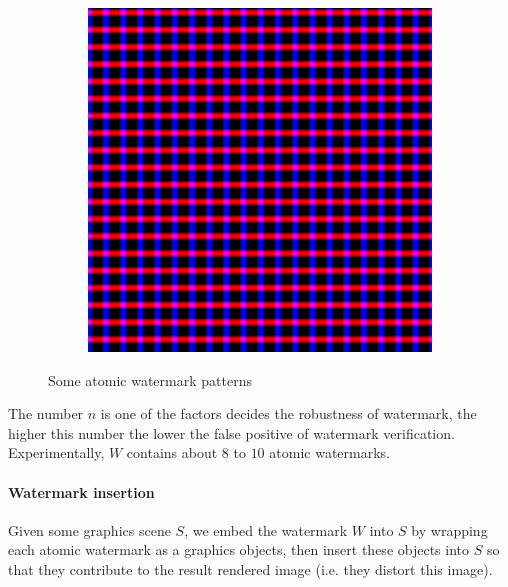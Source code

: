 \documentclass[a4paper,11pt,onecolumn]{memoir}
\begin{document}
\begin{figure}[h]
\begin{subfigure}[b]{0.25\textwidth}
        \includegraphics[width=\textwidth]{w_inferix_1.png}
    \end{subfigure}
    \caption[Some atomic watermark patterns]{Some atomic watermark patterns}
    \label{fig:atomic_patterns}
\end{figure}
The number $n$ is one of the factors decides the robustness of watermark, the higher this number the lower the false positive of watermark verification. Experimentally, $W$ contains about $8$ to $10$ atomic watermarks.

\paragraph[Watermark insertion]{Watermark insertion}
Given some graphics scene $S$, we embed the watermark $W$ into $S$ by wrapping each atomic watermark as a graphics objects, then insert these objects into $S$ so that they contribute to the result rendered image (i.e. they distort this image).
\end{document}
